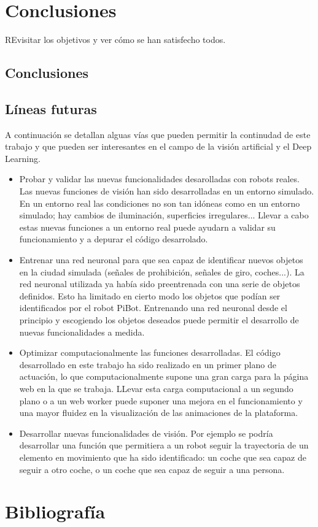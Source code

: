 \documentclass{report}
\begin{document}
\chapter{Conclusiones}
REvisitar los objetivos y ver cómo se han satisfecho todos.
\section{Conclusiones}
\section{Líneas futuras}
A continuación se detallan alguas vías que pueden permitir la continudad de este trabajo y que pueden ser interesantes en el campo de la visión artificial y el Deep Learning.

\begin{itemize}
\item Probar y validar las nuevas funcionalidades desarolladas con robots reales. Las nuevas funciones de visión han sido desarrolladas en un entorno simulado. En un entorno real las condiciones no son tan idóneas como en un entorno simulado; hay cambios de iluminación, superficies irregulares... Llevar a cabo estas nuevas funciones a un entorno real puede ayudarn a validar su funcionamiento y a depurar el código desarrolado.

\item Entrenar una red neuronal para que sea capaz de identificar nuevos objetos en la ciudad simulada (señales de prohibición, señales de giro, coches...). La red neuronal utilizada ya había sido preentrenada con una serie de objetos definidos. Esto ha limitado en cierto modo los objetos que podían ser identificados por el robot PiBot. Entrenando una red neuronal desde el principio y escogiendo los objetos deseados puede permitir el desarrollo de nuevas funcionalidades a medida.

\item Optimizar computacionalmente las funciones desarrolladas. El código desarrollado en este trabajo ha sido realizado en un primer plano de actuación, lo que computacionalmente supone una gran carga para la página web en la que se trabaja. LLevar esta carga computacional a un segundo plano o a un web worker puede suponer una mejora en el funcionamiento y una mayor fluidez en la visualización de las animaciones de la plataforma. 

\item Desarrollar nuevas funcionalidades de visión. Por ejemplo se podría desarrollar una función que permitiera a un robot seguir la trayectoria de un elemento en movimiento que ha sido identificado: un coche que sea capaz de seguir a otro coche, o un coche que sea capaz de seguir a una persona.
\end{itemize}

\chapter{Bibliografía}
\end{document}

